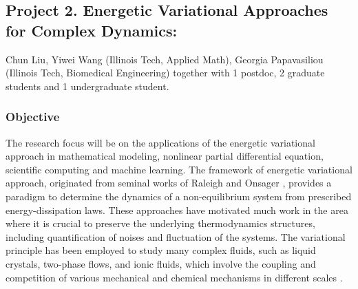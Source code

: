 \documentclass[11pt]{NSFamsart}
\begin{document}
\iffalse
\noindent \textbf{Regular group activities:} We will hold   the weekly Stochastic Dynamics Seminar. The key component     is for     students present articles relevant for the main topics of the
project followed by a discussion of how the methods developed in our research could be applied to emerging
areas of   research (e.g., gene networks, climate models, machine learning inspired by stochastic dynamics). This will enhance our students’ grasp of the important current research topics
and potentially lead to new collaborations. We also propose that graduate students and postdoc regularly
make short presentations on their research progress to all RTG participants, followed by a discussion of next steps in each individual research project.


 \textbf{Yearly workshop:} A two-day workshop will be organized in the end of each academic year. Each workshop will consist   of presentations by graduate
students and postdocs, with one or two invited lectures (funded internally by the math department) given
by top researchers. These researchers will be chosen from experts.   
\fi

\subsection*{Project 2. Energetic Variational Approaches for Complex Dynamics:}
Chun Liu, Yiwei Wang (Illinois Tech, Applied Math), Georgia Papavasiliou (Illinois Tech, Biomedical Engineering) together with 1 postdoc, 2 graduate students and 1 undergraduate student.
\subsubsection*{Objective} The research focus will be on the applications of the energetic variational approach in mathematical modeling, nonlinear partial differential equation, scientific computing and machine learning. The framework of energetic variational approach, originated from seminal works of Raleigh \cite{strutt1871some} and Onsager \cite{onsager1931reciprocal,onsager1931reciprocal2}, provides a paradigm to determine the dynamics of a non-equilibrium system from prescribed energy-dissipation laws.
These approaches have motivated much work in the area where it is crucial to preserve the underlying
thermodynamics structures, including quantification of noises and fluctuation of the systems.
The variational principle has been employed to study many complex fluids, such as liquid crystals, two-phase flows, and ionic fluids, which involve the coupling and competition of various mechanical and chemical mechanisms in different scales \cite{lin2001static, feng2005energetic, LiLiZh05, Lin2007, liu2009introduction, du2009energetic, sun2009energetic, eisenberg2010energy, Giga2017, Liu2019, knopf2020phase}.
\end{document}
